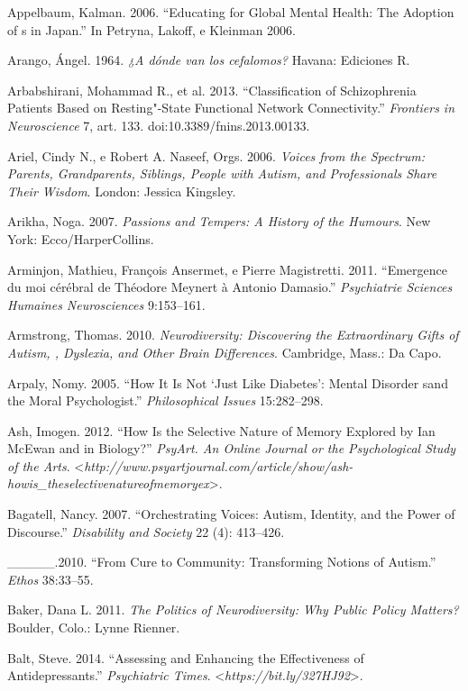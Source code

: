 {\begin{Parskip}
Appelbaum, Kalman. 2006. ``Educating for Global Mental Health: The
Adoption of s in Japan.'' In Petryna, Lakoff, e Kleinman 2006.

Arango, Ángel. 1964. \emph{¿A dónde van los cefalomos?} Havana:
Ediciones R.

Arbabshirani, Mohammad R., et al. 2013. ``Classification of
Schizophrenia Patients Based on Resting"-State Functional Network
Connectivity.'' \emph{Frontiers in Neuroscience} 7, art. 133.
doi:10.3389/fnins.2013.00133.

Ariel, Cindy N., e Robert A. Naseef, Orgs. 2006. \emph{Voices from the
Spectrum: Parents, Grandparents, Siblings, People with Autism, and
Professionals Share Their Wisdom}. London: Jessica Kingsley.

Arikha, Noga. 2007. \emph{Passions and Tempers: A History of the
Humours}. New York: Ecco/HarperCollins.

Arminjon, Mathieu, François Ansermet, e Pierre Magistretti. 2011.
``Emergence du moi cérébral de Théodore Meynert à Antonio Damasio.''
\emph{Psychiatrie Sciences Humaines Neurosciences} 9:153--161.

Armstrong, Thomas. 2010. \emph{Neurodiversity: Discovering the
Extraordinary Gifts of Autism, , Dyslexia, and Other Brain
Differences}. Cambridge, Mass.: Da Capo.

Arpaly, Nomy. 2005. ``How It Is Not `Just Like Diabetes': Mental
Disorder sand the Moral Psychologist.'' \emph{Philosophical Issues}
15:282--298.

Ash, Imogen. 2012. ``How Is the Selective Nature of Memory Explored by
Ian McEwan and in Biology?'' \emph{PsyArt. An Online Journal or the
Psychological Study of the Arts}.
\textless{}\emph{http://www.psyartjournal.com/article/show/ash-howis\_theselectivenatureofmemoryex}\textgreater{}.

Bagatell, Nancy. 2007. ``Orchestrating Voices: Autism, Identity, and the
Power of Discourse.'' \emph{Disability and Society} 22 (4): 413--426.

\_\_\_\_\_.2010. ``From Cure to Community: Transforming Notions of
Autism.'' \emph{Ethos} 38:33--55.

Baker, Dana L. 2011. \emph{The Politics of Neurodiversity: Why Public
Policy Matters?} Boulder, Colo.: Lynne Rienner.

Balt, Steve. 2014. ``Assessing and Enhancing the Effectiveness of
Antidepressants.'' \emph{Psychiatric Times}.
\textless{}\emph{https://bit.ly/327HJ92}\textgreater{}.


\end{Parskip}}

